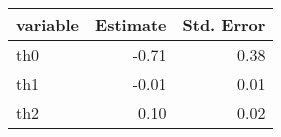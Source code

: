 \begin{tabular}{lrr}
  \hline
variable & Estimate & Std. Error \\ 
  \hline
th0 & -0.71 & 0.38 \\ 
  th1 & -0.01 & 0.01 \\ 
  th2 & 0.10 & 0.02 \\ 
   \hline
\end{tabular}
